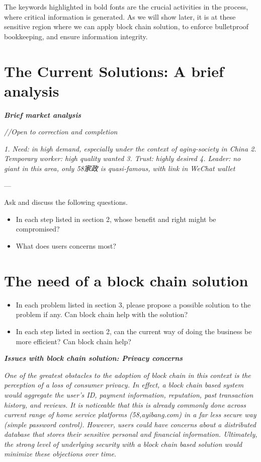 \documentclass[]{scrartcl}
\begin{document}
The keywords highlighted in bold fonts are the crucial activities in the process, where critical information is generated. As we will show later, it is at these sensitive region where we can apply block chain solution, to enforce bulletproof bookkeeping, and ensure information integrity.





\section{The Current Solutions: A brief analysis}

\textbf{\textit{Brief market analysis}}

\textit{//Open to correction and completion}

\textit{1. Need: in high demand, especially under the context of aging-society in China
	2. Temporary worker: high quality wanted
	3. Trust: highly desired
	4. Leader: no giant in this area, only 58家政 is quasi-famous, with link in WeChat wallet
}
\cite{GSReport}
\cite{ZHIHU1}
\cite{ZHIHU2}

---

Ask and discuss the following questions.
\begin{itemize}
\item In each step listed in section 2, whose benefit and right might be compromised?
\item What does users concerns most?
\end{itemize}




\section{The need of a block chain solution}
\begin{itemize}
\item In each problem listed in section 3, please propose a possible solution to the problem if any. Can block chain help with the solution?
\item In each step listed in section 2, can the current way of doing the business be more efficient? Can block chain help?
\end{itemize}

\textbf{\textit{Issues with block chain solution: Privacy concerns}}


\textit{One of the greatest obstacles to the adoption of block chain in this context is the perception of a loss of consumer privacy. In effect, a block chain based system would aggregate the user’s ID, payment information, reputation, past transaction history, and reviews. It is noticeable that this is already commonly done across current range of home service platforms (58,ayibang.com) in a far less secure way (simple password control). However, users could have concerns about a distributed database that stores their sensitive personal and financial information. Ultimately, the strong level of underlying security with a block chain based solution would minimize these objections over time.}
\end{document}
